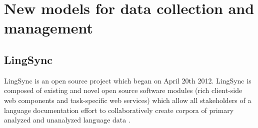 \documentclass[11pt]{article}
\begin{document}





\section{New models for data collection and management}

\label{sec:lingsync-old}

\subsection{LingSync}\label{sec:lingsync}

LingSync is an open source project which began on April 20th 2012. 
LingSync is composed of existing and novel open source software modules (rich client-side web
components and task-specific web services) which allow all stakeholders of a
language documentation effort to collaboratively create corpora of primary
analyzed and unanalyzed language data \cite{lingsync:2012}.
\end{document}
